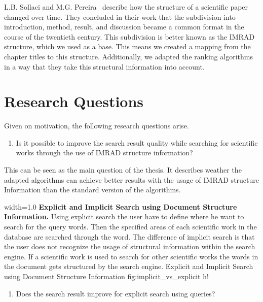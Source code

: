 L.B. Sollaci and M.G. Pereira~\cite{Sollaci-The-2004} describe how the structure of a scientific paper changed over time. They concluded in their work that the subdivision into introduction, method, result, and discussion became a common format in the course of the twentieth century. This subdivision is better known as the IMRAD structure, which we used as a base. This means we created a mapping from the chapter titles to this structure. Additionally, we adapted the ranking algorithms in a way that they take this structural information into account.


\section{Research Questions}
\label{sec:research_questions}

Given on motivation, the following research questions arise.

\begin{enumerate}
  \item Is it possible to improve the search result quality while searching for scientific works through the use of IMRAD structure information?
\end{enumerate}

This can be seen as the main question of the thesis. It describes weather the adapted algorithms can achieve better results with the usage of IMRAD structure Information than the standard version of the algorithms.

      {width=1.0\textwidth}
      {\textbf{Explicit and Implicit Search using Document Structure Information.} Using explicit search the user have to define where he want to search for the query words. Then the specified areas of each scientific work in the database are searched through the word. The difference of implicit search is that the user does not recognize the usage of structural information within the search engine. If a scientific work is used to search for other scientific works the words in the document gets structured by the search engine.}
      {Explicit and Implicit Search using Document Structure Information}
      {fig:implicit_vs_explicit}
      {h!}

\begin{enumerate}[label=1.\arabic*]
  \item Does the search result improve for explicit search using queries?
\end{enumerate}

